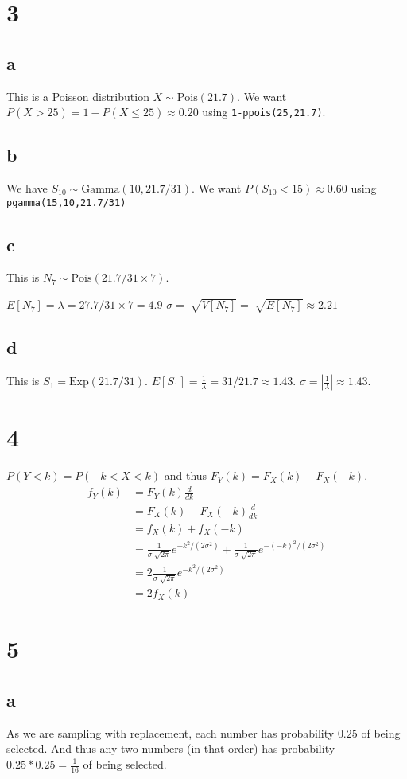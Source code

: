 \documentclass[10pt]{article}
\begin{document}
\section*{3}
\subsection*{a}
This is a Poisson distribution $X\sim\text{Pois}(21.7).$ We want $P(X>25)=1-P(X\le25)\approx0.20$ using \texttt{1-ppois(25,21.7)}.
\subsection*{b}
We have $S_{10}\sim\text{Gamma}(10, 21.7/31).$ We want $P(S_{10}<15)\approx0.60$ using \texttt{pgamma(15,10,21.7/31)}
\subsection*{c}
This is $N_7\sim\text{Pois}(21.7/31\times7).$

$E[N_7]=\lambda=27.7/31\times7=4.9$
$\sigma = \sqrt[]{V[N_7]}=\sqrt[]{E[N_7]}\approx2.21$

\subsection*{d}
This is $S_1=\text{Exp}(21.7/31).$
$E[S_1]=\frac{1}{\lambda}=31/21.7\approx1.43.$
$\sigma=|\frac{1}{\lambda}|\approx1.43.$

\section*{4}
$P(Y<k)=P(-k<X<k)$ and thus $F_Y(k)=F_X(k)-F_X(-k)$.
\begin{align*}
    f_Y(k) &= F_Y(k)\frac{d}{dk}\\
    &= F_X(k)-F_X(-k)\frac{d}{dk}\\
    &= f_X(k)+f_X(-k)\\
    &=\frac{1}{\sigma\sqrt[]{2\pi}}e^{-k^2/(2\sigma^2)}+\frac{1}{\sigma\sqrt[]{2\pi}}e^{-(-k)^2/(2\sigma^2)}\\
    &= 2\frac{1}{\sigma\sqrt[]{2\pi}}e^{-k^2/(2\sigma^2)}\\
    &= 2f_X(k)
\end{align*}

\section*{5}
\subsection*{a}
As we are sampling with replacement, each number has probability $0.25$ of being selected. And thus any two numbers (in that order) has probability $0.25*0.25 = \frac{1}{16}$ of being selected.
\end{document}
